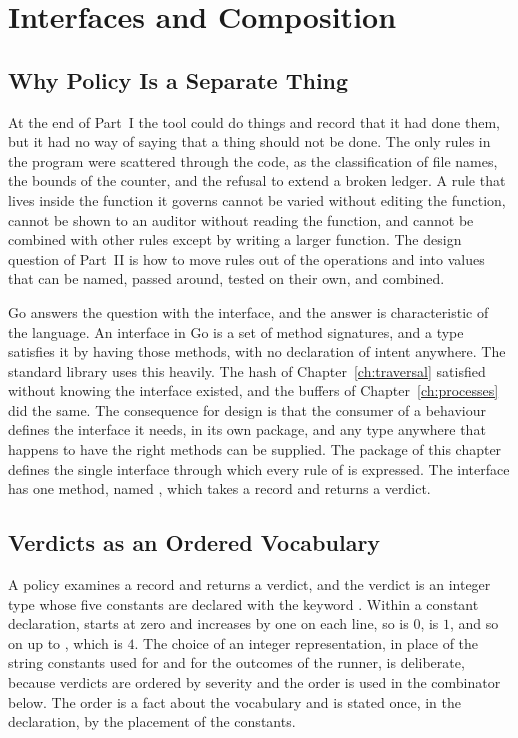 \chapter{Interfaces and Composition}
\label{ch:interfaces}

\section{Why Policy Is a Separate Thing}

At the end of Part~I the tool could do things and record that it had done them, but it had no way of saying that a thing should not be done. The only rules in the program were scattered through the code, as the classification of file names, the bounds of the counter, and the refusal to extend a broken ledger. A rule that lives inside the function it governs cannot be varied without editing the function, cannot be shown to an auditor without reading the function, and cannot be combined with other rules except by writing a larger function. The design question of Part~II is how to move rules out of the operations and into values that can be named, passed around, tested on their own, and combined.

Go answers the question with the interface, and the answer is characteristic of the language. An interface in Go is a set of method signatures, and a type satisfies it by having those methods, with no declaration of intent anywhere. The standard library uses this heavily. The hash of Chapter~\ref{ch:traversal} satisfied  without knowing the interface existed, and the buffers of Chapter~\ref{ch:processes} did the same. The consequence for design is that the consumer of a behaviour defines the interface it needs, in its own package, and any type anywhere that happens to have the right methods can be supplied. The package of this chapter defines the single interface through which every rule of \golab{} is expressed. The interface has one method, named , which takes a record and returns a verdict.


\section{Verdicts as an Ordered Vocabulary}

A policy examines a record and returns a verdict, and the verdict is an integer type whose five constants are declared with the keyword . Within a constant declaration,  starts at zero and increases by one on each line, so  is $0$,  is $1$, and so on up to , which is $4$. The choice of an integer representation, in place of the string constants used for  and for the outcomes of the runner, is deliberate, because verdicts are ordered by severity and the order is used in the combinator below. The order is a fact about the vocabulary and is stated once, in the declaration, by the placement of the constants.

